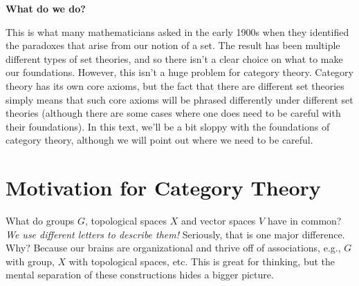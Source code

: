     \begin{center}
        \textbf{What do we do?}
    \end{center}
    This is what many mathematicians asked in the early 1900s
    when they identified the paradoxes that arise from our notion of
    a set. The result has been multiple different types of set theories, 
    and so there isn't a clear 
    choice on what to make our foundations. However, this isn't a huge problem 
    for category theory. Category theory 
    has its own core axioms, but the fact that there are different set theories 
    simply means that such core axioms will be phrased differently under different 
    set theories (although there are some cases where 
    one does need to be careful with their foundations).
    In this text, we'll be a bit sloppy with the foundations of category theory, 
    although  we will point out where we need to be careful.


    \newpage
    \section{Motivation for Category Theory}
    What do groups $G$, topological spaces $X$ and vector spaces $V$ have 
    in common?
    \emph{We use different letters to describe them!} Seriously, that is one major 
    difference. Why? Because our brains are organizational and thrive off of associations, 
    e.g., $G$ with group, $X$ with topological spaces, etc. This is great 
    for thinking, but the mental separation of these constructions hides a bigger 
    picture.

